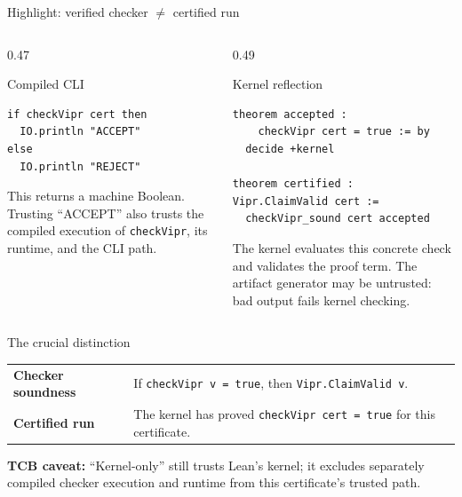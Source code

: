 \documentclass[aspectratio=169,11pt]{beamer}
\newcommand{\code}[1]{\texttt{#1}}
\begin{document}
\begin{frame}[fragile]{Highlight: verified checker $\neq$ certified run}
  \begin{columns}[T]
    \begin{column}{0.47\textwidth}
      \begin{alertblock}{Compiled CLI}
\begin{lstlisting}[basicstyle=\ttfamily\scriptsize]
if checkVipr cert then
  IO.println "ACCEPT"
else
  IO.println "REJECT"
\end{lstlisting}
        \footnotesize
        This returns a machine Boolean. Trusting ``ACCEPT'' also trusts the
        compiled execution of \code{checkVipr}, its runtime, and the CLI path.
      \end{alertblock}
    \end{column}
    \begin{column}{0.49\textwidth}
      \begin{block}{Kernel reflection}
\begin{lstlisting}[basicstyle=\ttfamily\scriptsize]
theorem accepted :
    checkVipr cert = true := by
  decide +kernel

theorem certified : Vipr.ClaimValid cert :=
  checkVipr_sound cert accepted
\end{lstlisting}
        \footnotesize
        The kernel evaluates this concrete check and validates the proof term.
        The artifact generator may be untrusted: bad output fails kernel checking.
      \end{block}
    \end{column}
  \end{columns}

  \begin{block}{The crucial distinction}
    \footnotesize
    \begin{tabular}{@{}p{}@{\quad}p{}@{}}
      \textbf{Checker soundness} &
      If \code{checkVipr v = true}, then \code{Vipr.ClaimValid v}.\\[0.35em]
      \textbf{Certified run} &
      The kernel has proved \code{checkVipr cert = true} for this certificate.
    \end{tabular}
  \end{block}

  \tiny
  \textbf{TCB caveat:} ``Kernel-only'' still trusts Lean's kernel; it excludes
  separately compiled checker execution and runtime from this certificate's trusted path.
\end{frame}
\end{document}
